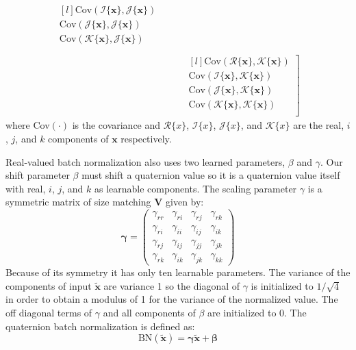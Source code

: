 \documentclass[conference]{IEEEtran}
\begin{document}
\begin{align}
\begin{matrix*}[l]
\mbox{Cov}(\mathscr{I}\{\textbf{x}\}, \mathscr{J}\{\textbf{x}\}) \\
\mbox{Cov}(\mathscr{J}\{\textbf{x}\}, \mathscr{J}\{\textbf{x}\}) \\
\mbox{Cov}(\mathscr{K}\{\textbf{x}\}, \mathscr{J}\{\textbf{x}\}) \\
\end{matrix*} \nonumber \\
&~~~~~~~~ \left.
\begin{matrix*}[l]
\mbox{Cov}(\mathscr{R}\{\textbf{x}\}, \mathscr{K}\{\textbf{x}\}) \\
\mbox{Cov}(\mathscr{I}\{\textbf{x}\}, \mathscr{K}\{\textbf{x}\}) \\
\mbox{Cov}(\mathscr{J}\{\textbf{x}\}, \mathscr{K}\{\textbf{x}\}) \\
\mbox{Cov}(\mathscr{K}\{\textbf{x}\}, \mathscr{K}\{\textbf{x}\}) \\
\end{matrix*}  \right]
\label{eq:V4d}
\end{align}
where Cov$(\cdot)$ is the covariance and $\mathscr{R}\{x\}$, $\mathscr{I}\{x\}$, $\mathscr{J}\{x\}$, and $\mathscr{K}\{x\}$ are the real, $i$, $j$, and $k$ components of $\textbf{x}$ respectively.

Real-valued batch normalization also uses two learned parameters, $\beta$ and $\gamma$. 
Our shift parameter {\boldmath$\beta$} must shift a quaternion value so it is a quaternion value itself with real, $i$, $j$, and $k$ as learnable components. 
The scaling parameter {\boldmath$\gamma$} is a symmetric matrix of size matching $\textbf{V}$ given by:
\begin{equation}
\mathbf{\gamma}
=
\left( 
\begin{array}{cccc}
\gamma_{rr} & \gamma_{ri} & \gamma_{rj} & \gamma_{rk} \\
\gamma_{ri} & \gamma_{ii} & \gamma_{ij} & \gamma_{ik} \\
\gamma_{rj} & \gamma_{ij} & \gamma_{jj} & \gamma_{jk} \\
\gamma_{rk} & \gamma_{ik} & \gamma_{jk} & \gamma_{kk}
\end{array}
\right)
\label{eq:gamma}
\end{equation}
Because of its symmetry it has only ten learnable parameters. 
The variance of the components of input $\tilde{\textbf{x}}$ are variance 1 so the diagonal of {\boldmath$\gamma$} is initialized to $1/\sqrt{4}$ in order to obtain a modulus of 1 for the variance of the normalized value. 
The off diagonal terms of {\boldmath$\gamma$} and all components of {\boldmath$\beta$} are initialized to 0.
The quaternion batch normalization is defined as:
\begin{equation}
\mbox{BN}(\tilde{\textbf{x}}) = \mathbf{\gamma}\tilde{\textbf{x}} + \mathbf{\beta}
\label{eq:qbn}
\end{equation}
\end{document}
